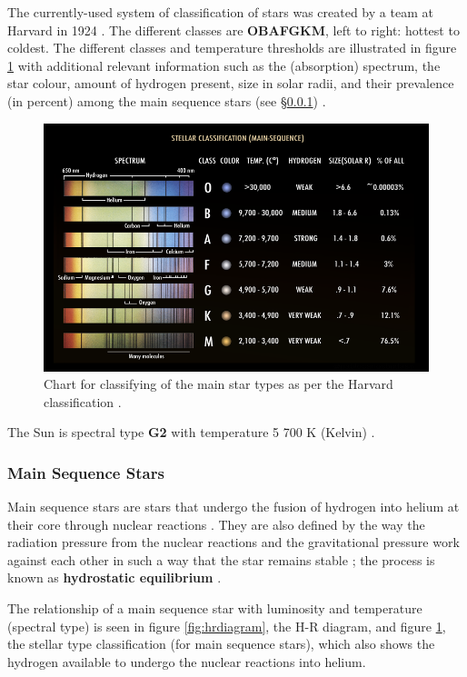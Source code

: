 \documentclass[12pt]{article}
\begin{document}
The currently-used system of classification of stars was created by a team at Harvard in 1924 \cite{harvardstar}. The different classes are \textbf{OBAFGKM}, left to right: hottest to coldest.
The different classes and temperature thresholds are illustrated in figure \ref{fig:starclassy} with additional relevant information such as the (absorption) spectrum, the star colour, amount of hydrogen present, 
size in solar radii, and their prevalence (in percent) among the main sequence stars (see §\ref{sec:1.2.2})
\cite{lcostar,cosmosstar}.

\begin{figure}[H]
    \centering
    \includegraphics[width=.9\textwidth]{Stellar_Classification_Chart.png}
    \caption{\centering Chart for classifying of the main star types as per the Harvard classification \protect\cite{wikistar}.}
    \label{fig:starclassy}
\end{figure}

The Sun is spectral type \textbf{G2} with temperature 5 700 K (Kelvin) \cite{cosmosstar}.

\subsubsection{Main Sequence Stars} \label{sec:1.2.2}

Main sequence stars are stars that undergo the fusion of hydrogen into helium at their core through nuclear reactions
\cite{schoolmsstar,studymsstar,nasamsstar}.
They are also defined by the way the radiation pressure from the nuclear reactions and the gravitational pressure work against each other in such a way that the star
remains stable \cite{studymsstar}; the process is known as \textbf{hydrostatic equilibrium} \cite{schoolmsstar}.

The relationship of a main sequence star with luminosity and temperature (spectral type) is seen in figure \ref{fig:hrdiagram}, the H-R diagram, and figure \ref{fig:starclassy},
the stellar type classification (for main sequence stars), which also shows the hydrogen available to undergo the nuclear reactions into helium.
\end{document}
